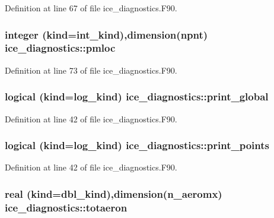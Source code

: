 Definition at line 67 of file ice\_\-diagnostics.F90.\hypertarget{namespaceice__diagnostics_a265877fbf85570a11a36cee45d4b1044}{
\subsubsection[{pmloc}]{\setlength{\rightskip}{0pt plus 5cm}integer (kind=int\_\-kind),dimension({\bf npnt}) {\bf ice\_\-diagnostics::pmloc}}}
\label{namespaceice__diagnostics_a265877fbf85570a11a36cee45d4b1044}


Definition at line 73 of file ice\_\-diagnostics.F90.\hypertarget{namespaceice__diagnostics_a0f58339d06d864451082d8805eaa03b1}{
\subsubsection[{print\_\-global}]{\setlength{\rightskip}{0pt plus 5cm}logical (kind=log\_\-kind) {\bf ice\_\-diagnostics::print\_\-global}}}
\label{namespaceice__diagnostics_a0f58339d06d864451082d8805eaa03b1}


Definition at line 42 of file ice\_\-diagnostics.F90.\hypertarget{namespaceice__diagnostics_a673176ef3ac5261be4052bc66ecec3cf}{
\subsubsection[{print\_\-points}]{\setlength{\rightskip}{0pt plus 5cm}logical (kind=log\_\-kind) {\bf ice\_\-diagnostics::print\_\-points}}}
\label{namespaceice__diagnostics_a673176ef3ac5261be4052bc66ecec3cf}


Definition at line 42 of file ice\_\-diagnostics.F90.\hypertarget{namespaceice__diagnostics_ae86e38feca7ea19893e632dd3ff7a5a9}{
\subsubsection[{totaeron}]{\setlength{\rightskip}{0pt plus 5cm}real (kind=dbl\_\-kind),dimension(n\_\-aeromx) {\bf ice\_\-diagnostics::totaeron}}}
\label{namespaceice__diagnostics_ae86e38feca7ea19893e632dd3ff7a5a9}


